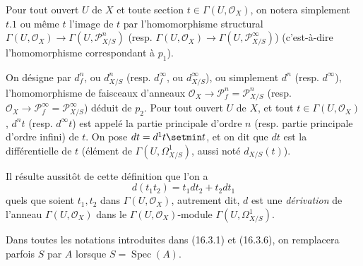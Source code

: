Pour tout ouvert $U$ de $X$ et toute section $t\in\Gamma(U,\mathcal{O}_X)$, on
notera simplement $t.1$ ou même $t$ l'image de $t$ par l'homomorphisme
structural $\Gamma(U,\mathcal{O}_X)\to\Gamma(U,\mathscr{P}_{X/S}^n)$ (resp.
$\Gamma(U,\mathcal{O}_X)\to\Gamma(U,\mathscr{P}_{X/S}^\infty)$)
(c'est-à-dire l'homomorphisme correspondant à $p_1$).

\begin{definition}[16.3.6]
On désigne par $d_f^n$, ou $d_{X/S}^n$ \textup{(resp.} $d_f^\infty$, ou
$d_{X/S}^\infty$), ou simplement $d^n$ \textup{(resp.} $d^\infty$), l'homomorphisme de
faisceaux d'anneaux $\mathcal{O}_X\to\mathscr{P}_f^n=\mathscr{P}_{X/S}^n$
\textup{(resp.} $\mathcal{O}_X\to\mathscr{P}_f^\infty=\mathscr{P}_{X/S}^\infty$)
déduit de $p_2$. Pour tout ouvert $U$ de $X$, et tout
$t\in\Gamma(U,\mathcal{O}_X)$, $d^nt$ \textup{(resp.} $d^\infty t$) est appelé \textup{la partie
principale d'ordre $n$ (resp. partie principale d'ordre infini)} de $t$. On pose
$dt=d^1t\setmin t$, et on dit que $dt$ est la différentielle de $t$ (élément de
$\Gamma(U,\varOmega_{X/S}^1)$, aussi noté $d_{X/S}(t)$).
\end{definition}

Il résulte aussitôt de cette définition que l'on a
\[
  d(t_1t_2)=t_1dt_2+t_2dt_1
  \tag{16.3.6.1}
  \label{IV.16.3.6.1}
\]
quels que soient $t_1,t_2$ dans $\Gamma(U,\mathcal{O}_X)$, autrement dit, $d$
est une \emph{dérivation} de l'anneau $\Gamma(U,\mathcal{O}_X)$ dans le
$\Gamma(U,\mathcal{O}_X)$-module $\Gamma(U,\varOmega_{X/S}^1)$.

Dans toutes les notations introduites dans (16.3.1) et (16.3.6), on remplacera
parfois $S$ par $A$ lorsque $S=\operatorname{Spec}(A)$.

